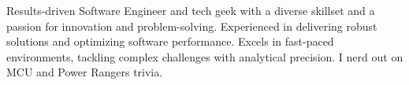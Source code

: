 

\begin{cvparagraph}

Results-driven Software Engineer and tech geek with a diverse skillset and a passion for innovation and problem-solving.  Experienced in delivering robust solutions and optimizing software performance. Excels in fast-paced environments, tackling complex challenges with analytical precision. I nerd out on MCU and Power Rangers trivia.
\end{cvparagraph}
